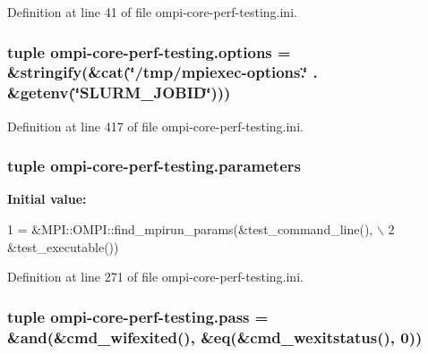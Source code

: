 Definition at line 41 of file ompi-\/core-\/perf-\/testing.\-ini.

\hypertarget{namespaceompi-core-perf-testing_a760d2751fa8a987c662b192792d0e6f2}{
\subsubsection[{options}]{\setlength{\rightskip}{0pt plus 5cm}tuple ompi-\/core-\/perf-\/testing.\-options = \&stringify(\&cat(\char`\"{}/tmp/mpiexec-\/options.\char`\"{} . \&getenv(\char`\"{}S\-L\-U\-R\-M\-\_\-\-J\-O\-B\-I\-D\char`\"{})))}}\label{namespaceompi-core-perf-testing_a760d2751fa8a987c662b192792d0e6f2}


Definition at line 417 of file ompi-\/core-\/perf-\/testing.\-ini.

\hypertarget{namespaceompi-core-perf-testing_a8b296a0041782bf28f9debd480c136cc}{
\subsubsection[{parameters}]{\setlength{\rightskip}{0pt plus 5cm}tuple ompi-\/core-\/perf-\/testing.\-parameters}}\label{namespaceompi-core-perf-testing_a8b296a0041782bf28f9debd480c136cc}
{\bfseries Initial value\-:}
\begin{DoxyCode}
1 = &MPI::OMPI::find\_mpirun\_params(&test\_command\_line(), \(\backslash\)
2                                             &test\_executable())
\end{DoxyCode}


Definition at line 271 of file ompi-\/core-\/perf-\/testing.\-ini.

\hypertarget{namespaceompi-core-perf-testing_a63aea59e5b483f2e47c3b25d6fb6e162}{
\subsubsection[{pass}]{\setlength{\rightskip}{0pt plus 5cm}tuple ompi-\/core-\/perf-\/testing.\-pass = \&and(\&cmd\-\_\-wifexited(), \&eq(\&cmd\-\_\-wexitstatus(), 0))}}\label{namespaceompi-core-perf-testing_a63aea59e5b483f2e47c3b25d6fb6e162}


